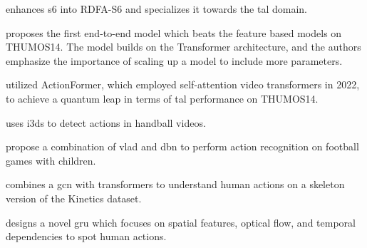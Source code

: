 \textcite{lee_enhancing_mamba_s6_2024} enhances \acrshort{s6} into RDFA-S6 and specializes it towards the \acrshort{tal} domain. 

\textcite{liu_adatad_2024} proposes the first end-to-end model which beats the feature based models on THUMOS14. The model builds on the Transformer architecture, and the authors emphasize the importance of scaling up a model to include more parameters. 

\textcite{zhang_actionformer_2022} utilized ActionFormer, which employed self-attention video transformers in 2022, to achieve a quantum leap in terms of \acrshort{tal} performance on THUMOS14. 

\textcite{host_handball_2023} uses \acrlong{i3d}s to detect actions in handball videos. 

\textcite{chen_children_2023} propose a combination of \acrfull{vlad} and \acrfull{dbn} to perform action recognition on football games with children. 

\textcite{wang_skeleton_two-stream_2023} combines a \acrfull{gcn} with transformers to understand human actions on a skeleton version of the Kinetics dataset.  

\textcite{giveki_human_2024} designs a novel \acrshort{gru} which focuses on spatial features, optical flow, and temporal dependencies to spot human actions. 
 









